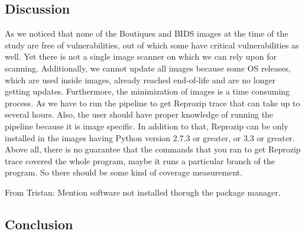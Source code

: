 \documentclass[a4paper,num-refs]{oup-contemporary}
\newcommand{\tristan}[1]{\color{blue}From Tristan: #1\color{black}}
\begin{document}
\subsection{Discussion}

As we noticed that none of the Boutiques and BIDS images at the time of the study are free of vulnerabilities, out of which
some have critical vulnerabilities as well. Yet there is not a single image scanner on which we can rely upon for
scanning. Additionally, we cannot update all images because some OS releases, which are used inside images, 
already reached end-of-life and are
no longer getting updates. Furthermore, the minimization of images is a time consuming process. As we have to run
the pipeline to get Reprozip trace that can take up to several hours. Also, the user should have proper knowledge
of running the pipeline because it is image specific. In addition to that, Reprozip can be only installed
in the images having Python version 2.7.3 or greater, or 3.3 or greater. Above all, there is no guarantee that
the commands that you ran to get Reprozip trace covered the whole program, maybe it runs a particular
branch of the program. So there should be some kind of coverage measurement.

\tristan{Mention software not installed thorugh the package manager.}

\subsection{Conclusion}
\end{document}
